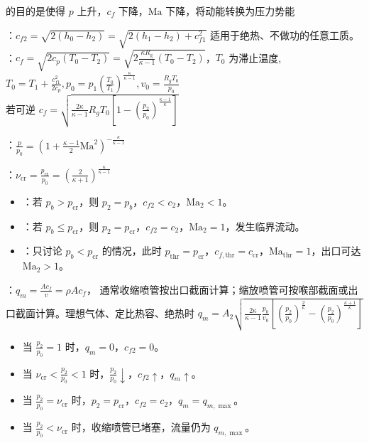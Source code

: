 的目的是使得 $p$ 上升，$c_f$ 下降，$\mathrm{Ma}$ 下降，将动能转换为压力势能

\divider

：$c_{f2}=\sqrt{2(h_0-h_2)}=\sqrt{2(h_1-h_2)+c_{f1}^2}$ 适用于绝热、不做功的任意工质。
：$c_f=\sqrt{2c_p(T_0-T_2)}=\sqrt{2\frac{\kappa R_{\mathrm{g}}}{\kappa-1}(T_{0}-T_{2})}$，$T_0$ 为滞止温度, $T_0=T_1+\frac{c_{f1}^2}{2c_p},p_0=p_1\left(\frac{T_0}{T_1}\right)^{\frac{\kappa}{\kappa-1}},v_0=\frac{R_gT_0}{p_0}$ \\
若可逆 $c_f=\sqrt{\frac{2\kappa}{\kappa-1}R_gT_0\left[1-\left(\frac{p_2}{p_0}\right)^{\frac{\kappa-1}{\kappa}}\right]}$

：$\frac{p}{p_0}=\left(1+\frac{\kappa -1}{2}\mathrm{Ma}^2\right)^{-\frac{\kappa}{\kappa -1}}$

：$\nu_{\mathrm{cr}}=\frac{p_{\mathrm{cr}}}{p_0}=\left(\frac{2}{\kappa+1}\right)^{\frac{\kappa}{\kappa-1}}$


\begin{itemize}
    \item {}：若 $p_b>p_{\mathrm{cr}}$，则 $p_2=p_b$，$c_{f2}<c_2$，$\mathrm{Ma}_2<1$。
    \item {}：若 $p_b\le p_{\mathrm{cr}}$，则 $p_2=p_{\mathrm{cr}}$，$c_{f2}=c_2$，$\mathrm{Ma}_2=1$，发生临界流动。
    \item {}：只讨论 $p_b<p_{\mathrm{cr}}$ 的情况，此时 $p_{\mathrm{thr}}=p_{\mathrm{cr}}$，$c_{f,\mathrm{thr}}=c_{\mathrm{cr}}$，$\mathrm{Ma}_{\mathrm{thr}}=1$，出口可达 $\mathrm{Ma}_2>1$。
\end{itemize}

：$q_m=\frac{A c_f}{v}=\rho A c_f$， 通常收缩喷管按出口截面计算；缩放喷管可按喉部截面或出口截面计算。理想气体、定比热容、绝热时 $q_m=A_2\sqrt{\frac{2\kappa}{\kappa-1}\frac{p_0}{v_0}\left[\left(\frac{p_2}{p_0}\right)^{\frac{2}{\kappa}}-\left(\frac{p_2}{p_0}\right)^{\frac{\kappa+1}{\kappa}}\right]}$

\begin{itemize}
    \item 当 $\frac{p_2}{p_0}=1$ 时，$q_m=0$，$c_{f2}=0$。
    \item 当 $\nu_{\mathrm{cr}}<\frac{p_2}{p_0}<1$ 时，$\frac{p_2}{p_0}\downarrow$，$c_{f2}\uparrow$，$q_m\uparrow$。
    \item 当 $\frac{p_2}{p_0}=\nu_{\mathrm{cr}}$ 时，$p_2=p_{\mathrm{cr}}$，$c_{f2}=c_2$，$q_m=q_{m,\max}$。
    \item 当 $\frac{p_2}{p_0}<\nu_{\mathrm{cr}}$ 时，收缩喷管已堵塞，流量仍为 $q_{m,\max}$。
\end{itemize}

